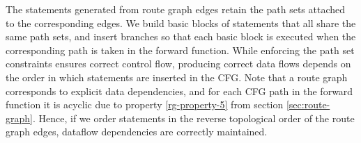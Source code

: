 
The statements generated from route graph edges retain the path sets attached to the corresponding edges.
We build basic blocks of statements that all share the same path sets, and insert branches so that each basic block is executed when the corresponding path is taken in the forward function. 
While enforcing the path set constraints ensures correct control flow, producing correct data flows depends on the order in which statements are inserted in the CFG.
Note that a route graph corresponds to explicit data dependencies, and for each CFG path in the forward function it is acyclic due to property \ref{rg-property-5} from section \ref{sec:route-graph}. 
Hence, if we order statements in the reverse topological order of the route graph edges, dataflow dependencies are correctly maintained.

